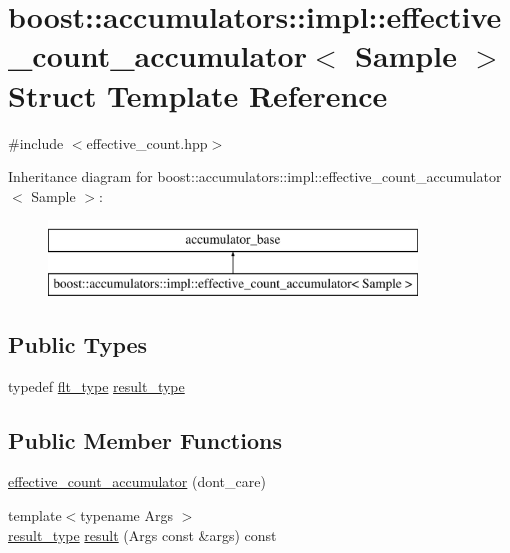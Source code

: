 \hypertarget{structboost_1_1accumulators_1_1impl_1_1effective__count__accumulator}{}\section{boost\+:\+:accumulators\+:\+:impl\+:\+:effective\+\_\+count\+\_\+accumulator$<$ Sample $>$ Struct Template Reference}
\label{structboost_1_1accumulators_1_1impl_1_1effective__count__accumulator}


{\ttfamily \#include $<$effective\+\_\+count.\+hpp$>$}

Inheritance diagram for boost\+:\+:accumulators\+:\+:impl\+:\+:effective\+\_\+count\+\_\+accumulator$<$ Sample $>$\+:\begin{figure}[H]
\begin{center}
\leavevmode
\includegraphics[height=2.000000cm]{structboost_1_1accumulators_1_1impl_1_1effective__count__accumulator}
\end{center}
\end{figure}
\subsection*{Public Types}
\begin{DoxyCompactItemize}
\item 
typedef \hyperlink{lib_2IceBRG__main_2common_8h_ad0f130a56eeb944d9ef2692ee881ecc4}{flt\+\_\+type} \hyperlink{structboost_1_1accumulators_1_1impl_1_1effective__count__accumulator_a5516ab157ca383ec0cea01649c3d9879}{result\+\_\+type}
\end{DoxyCompactItemize}
\subsection*{Public Member Functions}
\begin{DoxyCompactItemize}
\item 
\hyperlink{structboost_1_1accumulators_1_1impl_1_1effective__count__accumulator_ae3d2dd9daf6faa19d0f6cdee64af6a47}{effective\+\_\+count\+\_\+accumulator} (dont\+\_\+care)
\item 
{\footnotesize template$<$typename Args $>$ }\\\hyperlink{structboost_1_1accumulators_1_1impl_1_1effective__count__accumulator_a5516ab157ca383ec0cea01649c3d9879}{result\+\_\+type} \hyperlink{structboost_1_1accumulators_1_1impl_1_1effective__count__accumulator_a136494d144b3456c4c30ae7ae562b99b}{result} (Args const \&args) const 
\end{DoxyCompactItemize}


